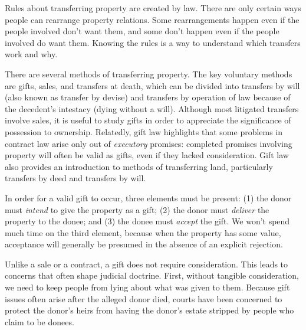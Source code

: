 Rules about transferring property are created by law.  There are only certain
ways people can rearrange property relations.  Some rearrangements happen even
if the people involved don't want them, and some don't happen even if the
people involved do want them.  Knowing the rules is a way to understand which
transfers work and why.

There are several methods of transferring property.  The key voluntary methods
are gifts, sales, and transfers at death, which can be divided  into transfers
by will (also known as transfer by devise) and transfers by operation of law
because of the decedent's intestacy (dying without a will).  Although most
litigated transfers involve sales, it is useful to study gifts in order to
appreciate the significance of possession to ownership.  Relatedly, gift law
highlights that some problems in contract law arise only out of
\textit{executory} promises: completed promises involving property will often
be valid as gifts, even if they lacked consideration.  Gift law also provides
an introduction to methods of transferring land, particularly transfers by deed
and transfers by will. 

In order for a valid gift to occur, three elements must be present: (1) the
donor must \textit{intend} to give the property as a gift; (2) the donor must
\textit{deliver} the property to the donee; and (3) the donee must
\textit{accept} the gift.  We won't spend much time on the third element,
because when the property has some value, acceptance will generally be presumed
in the absence of an explicit rejection. 

Unlike a sale or a contract, a gift does not require consideration. This leads
to concerns that often shape judicial doctrine.  First, without tangible
consideration, we need to keep people from lying about what was given to them. 
Because gift issues often arise after the alleged donor died, courts have been
concerned to protect the donor's heirs from having the donor's estate stripped
by people who claim to be donees. 

